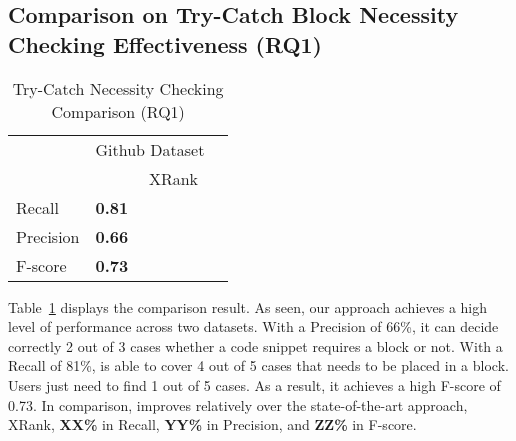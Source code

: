 \subsection{Comparison on Try-Catch Block Necessity Checking Effectiveness (RQ1)}
\label{sec:rq1}

\begin{table}[t]%
  \caption{Try-Catch Necessity Checking Comparison (RQ1)}
  \vspace{-12pt}
  \small
	\begin{center}
		\renewcommand{\arraystretch}{1}
		\begin{tabular}{|p{1.5cm}<{\centering}|p{1.25cm}<{\centering}|p{1.25cm}<{\centering}|p{1.25cm}<{\centering}}
		  \hline
			\multirow{2}{*}{} & \multicolumn{2}{c|}{Github Dataset} \\
			\cline{2-3}
			  & \tool  & XRank \\
			\hline
			Recall    & \textbf{0.81} & \\
			Precision & \textbf{0.66} & \\
			F-score   & \textbf{0.73} & \\
			\hline
		\end{tabular}
		\label{tab:xblock}
	\end{center}
\end{table}


Table~\ref{tab:xblock} displays the comparison result. As seen, our
approach achieves a high level of performance across two
datasets. With a Precision of 66\%, it can decide correctly 2 out of 3
cases whether a code snippet requires a  block or
not. With a Recall of 81\%, {\tool} is able to cover 4 out of 5 cases
that needs to be placed in a  block. Users just need
to find 1 out of 5 cases. As a result, it achieves a high F-score of
0.73.
In comparison, {\tool} improves relatively over the state-of-the-art
approach, XRank, {\bf XX\%} in Recall, {\bf YY\%} in Precision, and
{\bf ZZ\%} in F-score.


